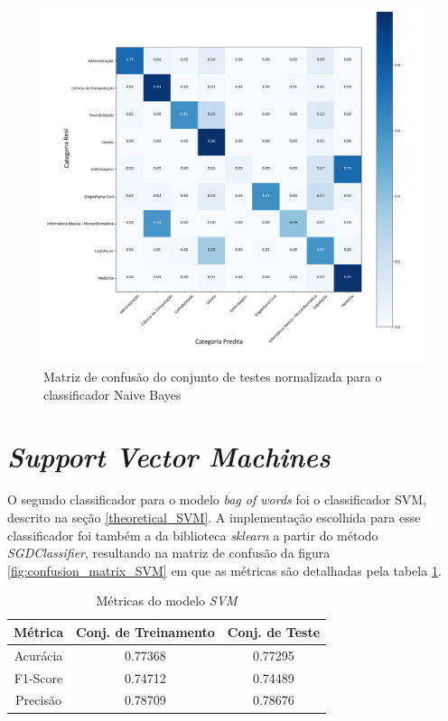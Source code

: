 \begin{figure}[!ht]
	\centering
	\includegraphics[width=1.1\textwidth]{figures/NB_-_Confusion_matrix_normalized_-_test.png}
	\caption{Matriz de confusão do conjunto de testes normalizada para o classificador Naive Bayes}
	\label{fig:confusion_matrix_NB}
\end{figure}

\section{\textit{Support Vector Machines}}

O segundo classificador para o modelo \textit{bag of words} foi o classificador SVM, descrito na seção \ref{theoretical_SVM}. A implementação escolhida para esse classificador foi também a da biblioteca \textit{sklearn} a partir do método \textit{SGDClassifier}, resultando na matriz de confusão da figura \ref{fig:confusion_matrix_SVM} em que as métricas são detalhadas pela tabela \ref{tab:SVM}.

\begin{table}[ht]
\centering
\caption{Métricas do modelo \textit{SVM}}
\vspace{0.5cm}
\begin{tabular}{c|c|c}
 
Métrica & Conj. de Treinamento & Conj. de Teste \\
\hline
Acurácia & 0.77368 & 0.77295 \\
F1-Score & 0.74712 & 0.74489 \\
Precisão & 0.78709 & 0.78676
\end{tabular}
\label{tab:SVM}
\end{table}


